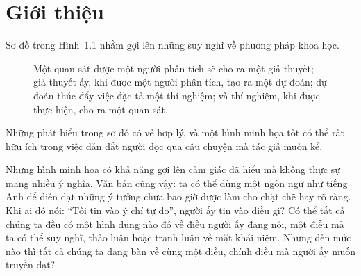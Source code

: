 \chapter{Giới thiệu}
\label{ch:introduction}

Sơ đồ trong Hình~1.1 nhằm gợi lên những suy nghĩ về phương pháp khoa học.

\begin{figure}[htbp]
\centering
{}
\caption{Một quan sát được một người phân tích sẽ cho ra một giả thuyết; giả thuyết ấy, khi được một người phân tích, tạo ra một dự đoán; dự đoán thúc đẩy việc đặc tả một thí nghiệm; và thí nghiệm, khi được thực hiện, cho ra một quan sát.}
\label{fig:scientific-method}
\end{figure}

Những phát biểu trong sơ đồ có vẻ hợp lý, và một hình minh họa tốt có thể rất hữu ích trong việc dẫn dắt người đọc qua câu chuyện mà tác giả muốn kể.

Nhưng hình minh họa có khả năng gợi lên cảm giác đã hiểu mà không thực sự mang nhiều ý nghĩa. Văn bản cũng vậy: ta có thể dùng một ngôn ngữ như tiếng Anh để diễn đạt những ý tưởng chưa bao giờ được làm cho chặt chẽ hay rõ ràng. Khi ai đó nói: ``Tôi tin vào ý chí tự do'', người ấy tin vào điều gì? Có thể tất cả chúng ta đều có một hình dung nào đó về điều người ấy đang nói, một điều mà ta có thể suy nghĩ, thảo luận hoặc tranh luận về mặt khái niệm. Nhưng đến mức nào thì tất cả chúng ta đang bàn về cùng một điều, chính điều mà người ấy muốn truyền đạt?

